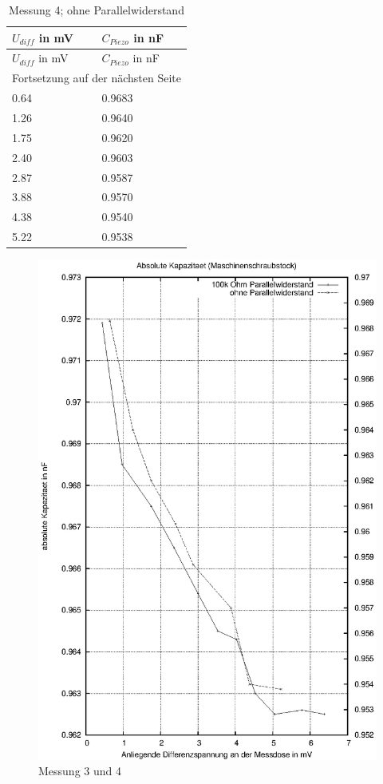 \documentclass[11pt]{scrreprt} %
\begin{document}
\setlongtables
\begin{longtable}{| l | l |}
\caption{Messung 4; ohne Parallelwiderstand}\\
\hline
$U_{diff}$ in mV&$C_{Piezo}$ in nF\\
\hline
\endfirsthead
\hline
$U_{diff}$ in mV&$C_{Piezo}$ in nF\\
\hline
\endhead
\hline
\multicolumn{2}{|c|}{Fortsetzung auf der nächsten Seite}\\
\hline
\endfoot
\hline \hline
\endlastfoot
\hline
\label{tab:2.4}%
0.64&0.9683\\
1.26&0.9640\\
1.75&0.9620\\
2.40&0.9603\\
2.87&0.9587\\
3.88&0.9570\\
4.38&0.9540\\
5.22&0.9538\\
\end{longtable}

\begin {figure}[htbp]
      \begin{center}
        \includegraphics{tabelle2_1_3}
      \end{center}
\caption{Messung 3 und 4}
\label{fig:2.3}
\end{figure}
\end{document}
